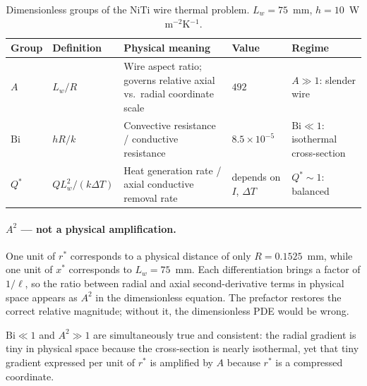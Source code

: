 \documentclass[12pt, a4paper]{article}
\begin{document}
\begin{table}[H]
\centering
\caption{Dimensionless groups of the NiTi wire thermal problem.
         $L_w = 75$~mm, $h = 10$~W\,m$^{-2}$K$^{-1}$.}
\label{tab:nondim_groups}
\begin{tabular}{l l p{3cm} l p{3.2cm}}
\toprule
\textbf{Group} & \textbf{Definition} & \textbf{Physical meaning} &
\textbf{Value} & \textbf{Regime} \\
\midrule
$A$
    & $L_w / R$
    & Wire aspect ratio; governs relative axial vs.\ radial coordinate scale
    & $492$
    & $A\gg1$: slender wire \\[3pt]
$\mathrm{Bi}$
    & $hR/k$
    & Convective resistance / conductive resistance
    & $8.5\times10^{-5}$
    & $\mathrm{Bi}\ll1$: isothermal cross-section \\[3pt]
$Q^*$
    & $QL_w^2/(k\Delta T)$
    & Heat generation rate / axial conductive removal rate
    & depends on $I$, $\Delta T$
    & $Q^*\sim1$: balanced \\
\bottomrule
\end{tabular}
\end{table}

\paragraph{$A^2$ — not a physical amplification.}
One unit of $r^*$ corresponds to a physical distance of only $R = 0.1525$~mm,
while one unit of $x^*$ corresponds to $L_w = 75$~mm. Each differentiation
brings a factor of $1/\ell$, so the ratio between radial and axial second-derivative
terms in physical space appears as $A^2$ in the dimensionless equation. The
prefactor restores the correct relative magnitude; without it, the dimensionless
PDE would be wrong.

$\mathrm{Bi}\ll1$ and $A^2\gg1$ are simultaneously true and consistent: the
radial gradient is tiny in physical space because the cross-section is nearly
isothermal, yet that tiny gradient expressed per unit of $r^*$ is amplified by $A$
because $r^*$ is a compressed coordinate.



\newpage
 

 
\end{document}
